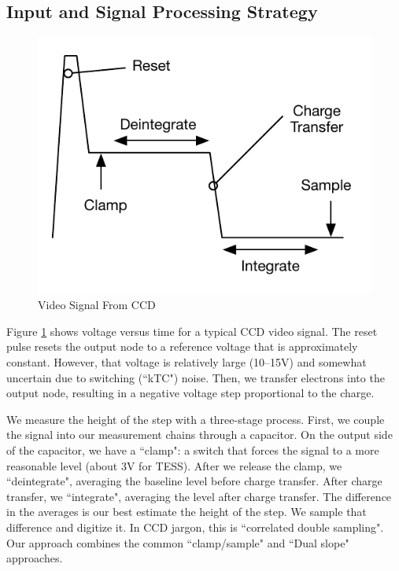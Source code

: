 \documentclass[12pt]{article}
\let\oldsubsection\subsection
\renewcommand{\subsection}{\FloatBarrier\oldsubsection}
\begin{document}
\subsection{Input and Signal Processing Strategy}
\begin{center}
\begin{figure}[ht!]
\centerline{\includegraphics[keepaspectratio=true]{Figs/VideoSig/VideoSig.pdf}}
 \caption{Video Signal From CCD}
 \label{VideoSig}
 \end{figure}
\end{center}
Figure \ref{VideoSig} shows voltage versus time for a typical CCD video signal. The reset pulse resets the output node to a reference voltage that is approximately constant. However, that voltage is relatively large (10--15V) and somewhat uncertain due to switching (``kTC") noise. Then, we transfer electrons into the output node, resulting in a negative voltage step proportional to the charge.

We measure the height of the step with a three-stage process. First, we couple the signal into our measurement chains through a capacitor. On the output side of the capacitor, we have a ``clamp": a switch that forces the signal to a more reasonable level (about 3V for TESS). After we release the clamp, we ``deintegrate", averaging the baseline level before charge transfer. After charge transfer, we ``integrate", averaging the level after charge transfer. The difference in the averages is our best estimate the height of the step. We sample that difference and digitize it. In CCD jargon, this is ``correlated double sampling". Our approach combines the common ``clamp/sample" and ``Dual slope" approaches.
\end{document}
